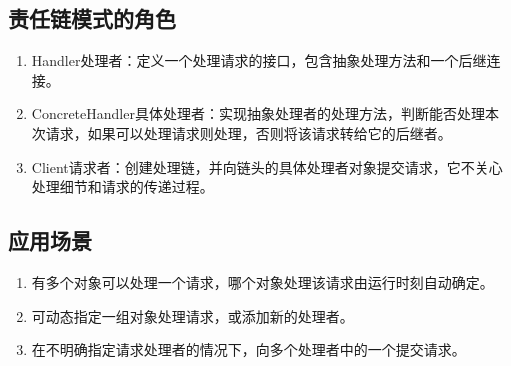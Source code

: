 \subsection{责任链模式的角色}
\begin{enumerate}
	\item Handler处理者：定义一个处理请求的接口，包含抽象处理方法和一个后继连接。
	\item ConcreteHandler具体处理者：实现抽象处理者的处理方法，判断能否处理本次请求，如果可以处理请求则处理，否则将该请求转给它的后继者。
	\item Client请求者：创建处理链，并向链头的具体处理者对象提交请求，它不关心处理细节和请求的传递过程。
\end{enumerate}
\subsection{应用场景}
\begin{enumerate}
	\item 有多个对象可以处理一个请求，哪个对象处理该请求由运行时刻自动确定。
	\item 可动态指定一组对象处理请求，或添加新的处理者。
	\item 在不明确指定请求处理者的情况下，向多个处理者中的一个提交请求。
\end{enumerate}
